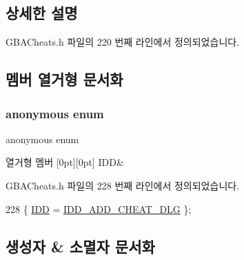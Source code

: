 \subsection{상세한 설명}


G\+B\+A\+Cheats.\+h 파일의 220 번째 라인에서 정의되었습니다.



\subsection{멤버 열거형 문서화}
\mbox{\label{class_add_c_b_a_code_ab086df2c41fbfe55405c6ac046dab7a5}} 
\subsubsection{\texorpdfstring{anonymous enum}{anonymous enum}}
{\footnotesize\ttfamily anonymous enum}

\begin{DoxyEnumFields}{열거형 멤버}
[0pt][0pt]{}\mbox{\label{class_add_c_b_a_code_ab086df2c41fbfe55405c6ac046dab7a5a74bfcc1c249905cacf32559b0a875855}} 
I\+DD&\\
\hline

\end{DoxyEnumFields}


G\+B\+A\+Cheats.\+h 파일의 228 번째 라인에서 정의되었습니다.


\begin{DoxyCode}
228 \{ \mbox{\hyperlink{class_add_c_b_a_code_ab086df2c41fbfe55405c6ac046dab7a5a74bfcc1c249905cacf32559b0a875855}{IDD}} = \mbox{\hyperlink{resource_8h_a388a8d7b6dea32798ece69044a21790d}{IDD\_ADD\_CHEAT\_DLG}} \};
\end{DoxyCode}


\subsection{생성자 \& 소멸자 문서화}
\mbox{\label{class_add_c_b_a_code_a13fcdd2e1451c66ac0744a631d95fdb8}} 
